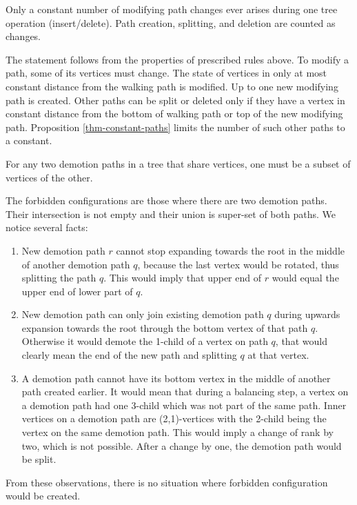 \begin{prop}
Only a constant number of modifying path changes ever arises during one tree operation (insert/delete). Path creation, splitting, and deletion are counted as changes.
\end{prop}

\begin{myproof}
The statement follows from the properties of prescribed rules above. To modify a path, some of its vertices must change. The state of vertices in only at most constant distance from the walking path is modified. Up to one new modifying path is created. Other paths can be split or deleted only if they have a vertex in constant distance from the bottom of walking path or top of the new modifying path. Proposition \ref{thm-constant-paths} limits the number of such other paths to a constant.
\end{myproof}

\begin{prop}
For any two demotion paths in a tree that share vertices, one must be a subset of vertices of the other.
\end{prop}

\begin{myproof}
The forbidden configurations are those where there are two demotion paths. Their intersection is not empty and their union is super-set of both paths. We notice several facts: 

\begin{enumerate}
\item New demotion path $r$ cannot stop expanding towards the root in the middle of another demotion path $q$, because the last vertex would be rotated, thus splitting the path $q$. This would imply that upper end of $r$ would equal the upper end of lower part of $q$.

\item New demotion path can only join existing demotion path $q$ during upwards expansion towards the root through the bottom vertex of that path $q$. Otherwise it would demote the 1-child of a vertex on path $q$, that would clearly mean the end of the new path and splitting $q$ at that vertex. 

\item A demotion path cannot have its bottom vertex in the middle of another path created earlier. It would mean that during a balancing step, a vertex on a demotion path had one 3-child which was not part of the same path. Inner vertices on a demotion path are (2,1)-vertices with the 2-child being the vertex on the same demotion path. This would imply a change of rank by two, which is not possible. After a change by one, the demotion path would be split.
\end{enumerate}
From these observations, there is no situation where forbidden configuration would be created. 
\end{myproof}

